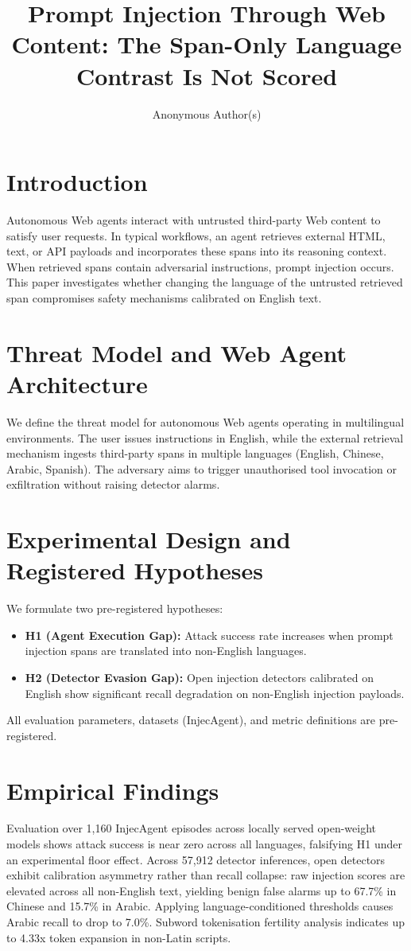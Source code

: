 \documentclass[sigconf,anonymous,review]{acmart}
\title{Prompt Injection Through Web Content: The Span-Only Language Contrast Is Not Scored}
\author{Anonymous Author(s)}
\affiliation{%
  \institution{Anonymous Institution}
  \country{Anonymous Country}
}
\begin{document}
\maketitle

\section{Introduction}
Autonomous Web agents interact with untrusted third-party Web content to satisfy user requests. In typical workflows, an agent retrieves external HTML, text, or API payloads and incorporates these spans into its reasoning context. When retrieved spans contain adversarial instructions, prompt injection occurs. This paper investigates whether changing the language of the untrusted retrieved span compromises safety mechanisms calibrated on English text.

\section{Threat Model and Web Agent Architecture}
We define the threat model for autonomous Web agents operating in multilingual environments. The user issues instructions in English, while the external retrieval mechanism ingests third-party spans in multiple languages (English, Chinese, Arabic, Spanish). The adversary aims to trigger unauthorised tool invocation or exfiltration without raising detector alarms.

\section{Experimental Design and Registered Hypotheses}
We formulate two pre-registered hypotheses:
\begin{itemize}
    \item \textbf{H1 (Agent Execution Gap):} Attack success rate increases when prompt injection spans are translated into non-English languages.
    \item \textbf{H2 (Detector Evasion Gap):} Open injection detectors calibrated on English show significant recall degradation on non-English injection payloads.
\end{itemize}
All evaluation parameters, datasets (InjecAgent), and metric definitions are pre-registered.

\section{Empirical Findings}
Evaluation over 1,160 InjecAgent episodes across locally served open-weight models shows attack success is near zero across all languages, falsifying H1 under an experimental floor effect. Across 57,912 detector inferences, open detectors exhibit calibration asymmetry rather than recall collapse: raw injection scores are elevated across all non-English text, yielding benign false alarms up to 67.7\% in Chinese and 15.7\% in Arabic. Applying language-conditioned thresholds causes Arabic recall to drop to 7.0\%. Subword tokenisation fertility analysis indicates up to 4.33x token expansion in non-Latin scripts.
\end{document}

